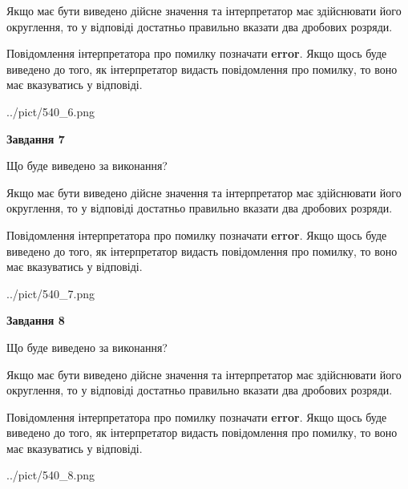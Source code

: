 \documentclass[12pt, ukrainian]{article}
\begin{document}
{\begin {Large}
Якщо має бути виведено дійсне значення та інтерпретатор має здійснювати його округлення, 
то у відповіді достатньо правильно вказати два дробових розряди.

Повідомлення інтерпретатора про помилку позначати \textbf{error}.
Якщо щось буде виведено до того, як інтерпретатор видасть повідомлення про помилку, 
то воно має вказуватись у відповіді. \par

\begin{center}
	{../pict/540_6.png}
\end{center}
\newpage

{\begin {center}\textbf{Завдання 7}\end {center}}\par
Що буде виведено за виконання? \par

Якщо має бути виведено дійсне значення та інтерпретатор має здійснювати його округлення, 
то у відповіді достатньо правильно вказати два дробових розряди.

Повідомлення інтерпретатора про помилку позначати \textbf{error}.
Якщо щось буде виведено до того, як інтерпретатор видасть повідомлення про помилку, 
то воно має вказуватись у відповіді. \par

\begin{center}
	{../pict/540_7.png}
\end{center}
\newpage

{\begin {center}\textbf{Завдання 8}\end {center}}\par
Що буде виведено за виконання? \par

Якщо має бути виведено дійсне значення та інтерпретатор має здійснювати його округлення, 
то у відповіді достатньо правильно вказати два дробових розряди.

Повідомлення інтерпретатора про помилку позначати \textbf{error}.
Якщо щось буде виведено до того, як інтерпретатор видасть повідомлення про помилку, 
то воно має вказуватись у відповіді. \par

\begin{center}
	{../pict/540_8.png}
\end{center}
\newpage


\end{Large}}
\end{document}
